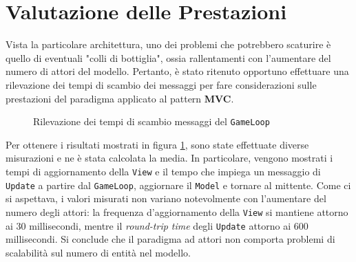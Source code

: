 \section{Valutazione delle Prestazioni}
Vista la particolare architettura, uno dei problemi che potrebbero scaturire è quello di eventuali "colli di
bottiglia", ossia rallentamenti con l'aumentare del numero di attori del modello. Pertanto, è stato ritenuto opportuno
effettuare una rilevazione dei tempi di scambio dei messaggi per fare considerazioni sulle prestazioni del paradigma
applicato al pattern \textbf{MVC}.

\begin{figure}[H]
    \centering
    \caption{Rilevazione dei tempi di scambio messaggi del \texttt{GameLoop}
    \label{fig:performance-evaluation}}
\end{figure}

Per ottenere i risultati mostrati in figura \ref{fig:performance-evaluation}, sono state effettuate diverse misurazioni
e ne è stata calcolata la media. In particolare, vengono mostrati i tempi di aggiornamento della \texttt{View} e il
tempo che impiega un messaggio di \texttt{Update} a partire dal \texttt{GameLoop}, aggiornare il \texttt{Model} e
tornare al mittente. Come ci si aspettava, i valori misurati non variano notevolmente con l'aumentare del numero degli
attori: la frequenza d'aggiornamento della \texttt{View} si mantiene attorno ai 30 millisecondi, mentre il
\textit{round-trip time} degli \texttt{Update} attorno ai 600 millisecondi. Si conclude che il paradigma ad attori
non comporta problemi di scalabilità sul numero di entità nel modello.